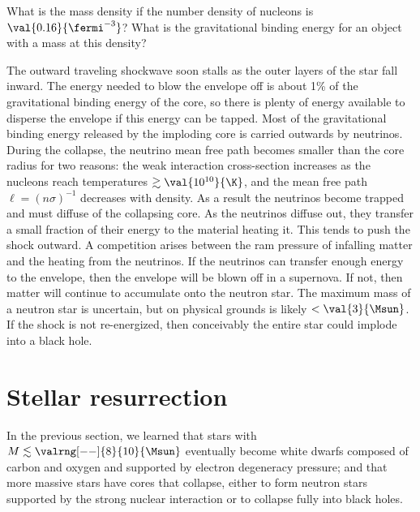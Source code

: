 \begin{exercisebox}
What is the mass density if the number density of nucleons is $\val{0.16}{\fermi^{-3}}$? What is the gravitational binding energy for an object with a mass  at this density?
\end{exercisebox}

The outward traveling shockwave soon stalls as the outer layers of the star fall inward. The energy needed to blow the envelope off is about 1\% of the gravitational binding energy of the core, so there is plenty of energy available to disperse the envelope if this energy can be tapped. Most of the gravitational binding energy released by the imploding core is carried outwards by neutrinos. 
During the collapse, the neutrino mean free path becomes smaller than the core radius for two reasons: the weak interaction cross-section increases as the nucleons reach temperatures $\gtrsim\val{10^{10}}{\K}$, and the mean free path $\ell = (n\sigma)^{-1}$ decreases with density. 
As a result the neutrinos become trapped and must diffuse of the collapsing core. As the neutrinos diffuse out, they transfer a small fraction of their energy to the material heating it. This tends to push the shock outward. A competition arises between the ram pressure of infalling matter and the heating from the neutrinos. If the neutrinos can transfer enough energy to the envelope, then the envelope will be blown off in a supernova. If not, then matter will continue to accumulate onto the neutron star. The maximum mass of a neutron star is uncertain, but on physical grounds is likely $< \val{3}{\Msun}$. If the shock is not re-energized, then conceivably the entire star could implode into a black hole.

\section{Stellar resurrection}
\label{s.stellar-resurrection}

In the previous section, we learned that stars with $M\lesssim\valrng[--]{8}{10}{\Msun}$ eventually become white dwarfs composed of carbon and oxygen and supported by electron degeneracy pressure; and that more massive stars have cores that collapse, either to form neutron stars supported by the strong nuclear interaction or to collapse fully into black holes.

